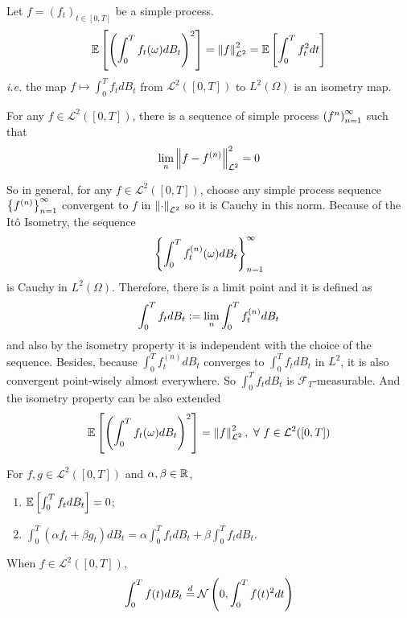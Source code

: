 \documentclass[a4paper,12pt]{article}
\begin{document}
\begin{itemize}
  \begin{thm}[It\^o Isometry]
    Let $f=(f_t)_{t \in [0,T]}$ be a simple process.
    \begin{equation*}
      \mathbb{E}\left[\left(\int_0^Tf_t(\omega)dB_t\right)^2\right] = \left\lVert f\right\lVert_{\mathcal{L}^2}^2 = \mathbb{E}\left[\int_0^Tf_t^2dt\right]
    \end{equation*}
    \emph{i.e.} the map $f \mapsto \int_0^Tf_tdB_t$ from $\mathcal{L}^2([0,T])$ to $L^2(\Omega)$ is an isometry map.
  \end{thm}

  \begin{thm}[Dense]
    For any $f \in \mathcal{L}^2([0,T])$, there is a sequence of simple process $\left(f^{n}\right)_{n=1}^{\infty}$ such that
    \begin{equation*}
      \lim_{n} \left\lVert f - f^{(n)}\right\lVert_{\mathcal{L}^2}^2 = 0
    \end{equation*}
  \end{thm}

  \noindent So in general, for any $f \in \mathcal{L}^2([0,T])$, choose any simple process sequence $\left\{f^{(n)}\right\}_{n=1}^{\infty}$ convergent to $f$ in $\left\lVert\cdot\right\lVert_{\mathcal{L}^2}$ so it is Cauchy in this norm. Because of the It\^o Isometry, the sequence
  \begin{equation*}
    \left\{\int_0^Tf_t^{(n)}(\omega)dB_t\right\}_{n=1}^{\infty}
  \end{equation*}
  is Cauchy in $L^2(\Omega)$. Therefore, there is a limit point and it is defined as
  \begin{equation*}
    \int_0^Tf_tdB_t \vcentcolon= \lim_n \int_0^Tf^{(n)}_tdB_t
  \end{equation*}
  and also by the isometry property it is independent with the choice of the sequence. Besides, because $\int_0^Tf^{(n)}_tdB_t$ converges to $\int_0^Tf_tdB_t$ in $L^2$, it is also convergent point-wisely almost everywhere. So $\int_0^Tf_tdB_t$ is $\mathcal{F}_T$-measurable. And the isometry property can be also extended
  \begin{equation*}
    \mathbb{E}\left[\left(\int_0^Tf_t(\omega)dB_t\right)^2\right] = \left\lVert f\right\lVert_{\mathcal{L}^2}^2,~\forall~f \in \mathcal{L}^2([0,T])
  \end{equation*}

  \begin{thm}
    For $f,g \in \mathcal{L}^2([0,T])$ and $\alpha, \beta \in \mathbb{R}$,
    \begin{enumerate}[label=(\arabic*)]
      \item $\mathbb{E}\left[\int_0^Tf_tdB_t\right] = 0$;
      \item $\int_0^T(\alpha f_t + \beta g_t)dB_t = \alpha \int_0^Tf_t dB_t + \beta\int_0^Tf_tdB_t$.
    \end{enumerate}
  \end{thm}
  \begin{rmk}
    When $f \in \mathcal{L}^2([0,T])$,
    \begin{equation*}
      \int_0^T f(t)dB_t \stackrel{d}{=} \mathcal{N}\left(0,\int^T_0f(t)^2dt\right)
    \end{equation*}
  \end{rmk}


\end{itemize}
\end{document}
